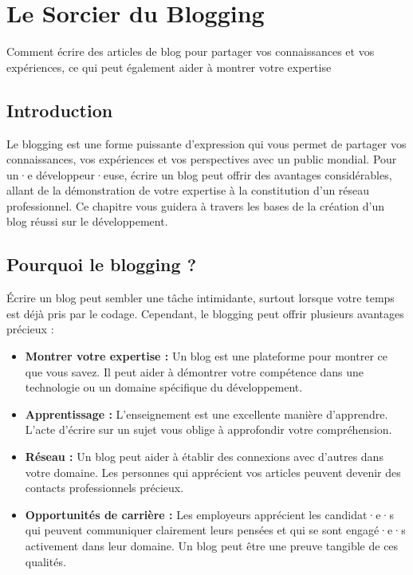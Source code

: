 
\chapter{Le Sorcier du Blogging }

Comment écrire des articles de blog pour partager vos connaissances et vos expériences, ce qui peut également aider à montrer votre expertise

\section{Introduction}

Le blogging est une forme puissante d'expression qui vous permet de partager vos connaissances, vos expériences et vos perspectives avec un public mondial. Pour un·e développeur·euse, écrire un blog peut offrir des avantages considérables, allant de la démonstration de votre expertise à la constitution d'un réseau professionnel. Ce chapitre vous guidera à travers les bases de la création d'un blog réussi sur le développement.

\section{Pourquoi le blogging ?}

Écrire un blog peut sembler une tâche intimidante, surtout lorsque votre temps est déjà pris par le codage. Cependant, le blogging peut offrir plusieurs avantages précieux :

\begin{itemize}
    \item \textbf{Montrer votre expertise :} Un blog est une plateforme pour montrer ce que vous savez. Il peut aider à démontrer votre compétence dans une technologie ou un domaine spécifique du développement.
    \item \textbf{Apprentissage :} L'enseignement est une excellente manière d'apprendre. L'acte d'écrire sur un sujet vous oblige à approfondir votre compréhension.
    \item \textbf{Réseau :} Un blog peut aider à établir des connexions avec d'autres dans votre domaine. Les personnes qui apprécient vos articles peuvent devenir des contacts professionnels précieux.
    \item \textbf{Opportunités de carrière :} Les employeurs apprécient les candidat·e·s qui peuvent communiquer clairement leurs pensées et qui se sont engagé·e·s activement dans leur domaine. Un blog peut être une preuve tangible de ces qualités.
\end{itemize}

